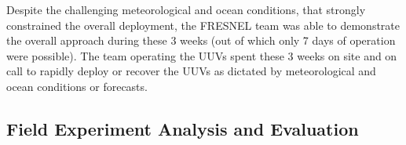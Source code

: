 Despite the challenging meteorological and ocean conditions, that strongly constrained the overall deployment, the FRESNEL team was able to demonstrate the overall approach during these 3 weeks (out of which only 7 days of operation were possible). The team operating the UUVs spent these 3 weeks on site and on call to rapidly deploy or recover the UUVs as dictated by meteorological and ocean conditions or forecasts. 



\subsection{Field Experiment Analysis and Evaluation}



    






